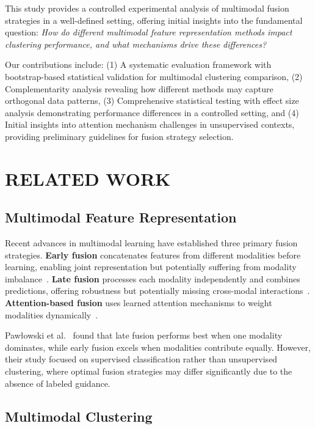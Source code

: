 \documentclass[sigconf]{acmart}
\begin{document}
This study provides a controlled experimental analysis of multimodal fusion strategies in a well-defined setting, offering initial insights into the fundamental question: \textit{How do different multimodal feature representation methods impact clustering performance, and what mechanisms drive these differences?}

Our contributions include: (1) A systematic evaluation framework with bootstrap-based statistical validation for multimodal clustering comparison, (2) Complementarity analysis revealing how different methods may capture orthogonal data patterns, (3) Comprehensive statistical testing with effect size analysis demonstrating performance differences in a controlled setting, and (4) Initial insights into attention mechanism challenges in unsupervised contexts, providing preliminary guidelines for fusion strategy selection.

\section{RELATED WORK}

\subsection{Multimodal Feature Representation}

Recent advances in multimodal learning have established three primary fusion strategies. \textbf{Early fusion} concatenates features from different modalities before learning, enabling joint representation but potentially suffering from modality imbalance~\cite{baltruvsaitis2018multimodal}. \textbf{Late fusion} processes each modality independently and combines predictions, offering robustness but potentially missing cross-modal interactions~\cite{ramachandram2017deep}. \textbf{Attention-based fusion} uses learned attention mechanisms to weight modalities dynamically~\cite{atrey2010multimodal}.

Pawłowski et al.~\cite{pawlowski2023effective} found that late fusion performs best when one modality dominates, while early fusion excels when modalities contribute equally. However, their study focused on supervised classification rather than unsupervised clustering, where optimal fusion strategies may differ significantly due to the absence of labeled guidance.

\subsection{Multimodal Clustering}
\end{document}
